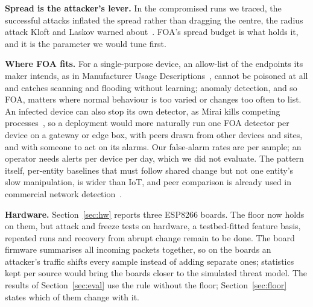 \textbf{Spread is the attacker's lever.} In the compromised runs we traced, the successful attacks
inflated the spread rather than dragging the centre, the radius attack Kloft and Laskov warned
about~\cite{kloft}. FOA's spread budget is what holds it, and it is the parameter we would tune first.

\textbf{Where FOA fits.} For a single-purpose device, an allow-list of the endpoints its maker intends,
as in Manufacturer Usage Descriptions~\cite{mud}, cannot be poisoned at all and catches scanning and
flooding without learning; anomaly detection, and so FOA, matters where normal behaviour is too varied
or changes too often to list. An infected device can also stop its own detector, as Mirai kills
competing processes~\cite{mirai}, so a deployment would more naturally run one FOA detector per device
on a gateway or edge box, with peers drawn from other devices and sites, and with someone to act on its
alarms. Our false-alarm rates are per sample; an operator needs alerts per device per day, which we did
not evaluate. The pattern itself, per-entity baselines that must follow shared change but not one
entity's slow manipulation, is wider than IoT, and peer comparison is already used in commercial
network detection~\cite{darktrace}.

\textbf{Hardware.} Section~\ref{sec:hw} reports three ESP8266 boards. The floor now holds on them, but
attack and freeze tests on hardware, a testbed-fitted feature basis, repeated runs and recovery from
abrupt change remain to be done. The board firmware summarises all incoming packets together, so on the
boards an attacker's traffic shifts every sample instead of adding separate ones; statistics kept per
source would bring the boards closer to the simulated threat model. The results
of Section~\ref{sec:eval} use the rule without the floor; Section~\ref{sec:floor} states which of them
change with it.
